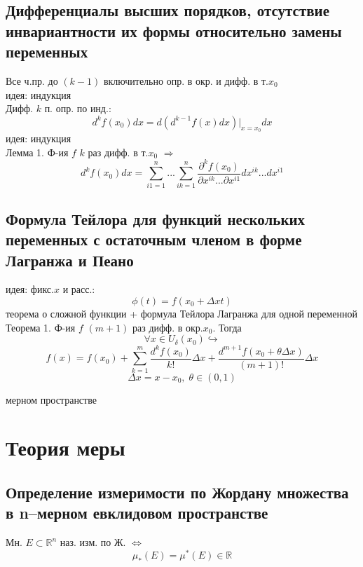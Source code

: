 \documentclass{article}
\begin{document}
\subsection{Дифференциалы высших порядков, отсутствие инвариантности их формы относительно замены переменных}
Все ч.пр. до $(k-1)$ включительно опр. в окр. и дифф. в т.$x_0$ \\
идея: индукция \\
Дифф. $k$ п. опр. по инд.:
\begin{equation*}
    d^k f(x_0) dx = d(d^{k-1} f(x) dx) \bigg |_{x=x_0} dx
\end{equation*}
идея: индукция \\
Лемма 1. Ф-ия $f$ $k$  раз дифф. в т.$x_0$ $\Rightarrow$
\begin{equation*}
    d^k f(x_0) dx = \sum_{i1=1}^n ... \sum_{ik=1}^n \frac{\partial ^k f(x_0)}{\partial x^{ik} ... \partial x^{i1}} dx^{ik} ... dx^{i1}
\end{equation*}
\subsection{Формула Тейлора для функций нескольких переменных с остаточным членом в форме Лагранжа и Пеано}
идея: фикс.$x$ и расс.: \\
\begin{equation*}
    \phi (t) = f(x_0+ \Delta x t)
\end{equation*}
теорема о сложной функции + формула Тейлора Лагранжа для одной переменной \\
Теорема 1. Ф-ия $f$ $(m+1)$ раз дифф. в окр.$x_0$. Тогда
\begin{equation*}
    \forall x \in U_\delta(x_0) \hookrightarrow
\end{equation*}
\begin{equation*}
    f(x) = f(x_0) + \sum_{k=1}^{m} \frac{d^k f(x_0)}{k!} \Delta x + \frac{d^{m+1} f(x_0+ \theta \Delta x)}{(m+1)!} \Delta x
\end{equation*}
\begin{equation*}
    \Delta x = x - x_0, \; \theta \in (0, 1)
\end{equation*}


\newpage
мерном пространстве
\section{Теория меры}
\subsection{Определение измеримости по Жордану множества в n–мерном евклидовом пространстве}
Мн. $E \subset \mathbb R^n$ наз. изм. по Ж. $\Leftrightarrow$
\begin{equation*}
    \mu_*(E) = \mu^*(E) \in \mathbb R
\end{equation*}
\end{document}

